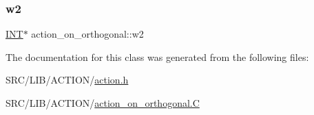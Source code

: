 \mbox{\label{classaction__on__orthogonal_a065f8bfe2652eb399fa66b9ead8000ce}} 
\subsubsection{\texorpdfstring{w2}{w2}}
{\footnotesize\ttfamily \mbox{\hyperlink{galois_8h_a09fddde158a3a20bd2dcadb609de11dc}{I\+NT}}$\ast$ action\+\_\+on\+\_\+orthogonal\+::w2}



The documentation for this class was generated from the following files\+:\begin{DoxyCompactItemize}
\item 
S\+R\+C/\+L\+I\+B/\+A\+C\+T\+I\+O\+N/\mbox{\hyperlink{action_8h}{action.\+h}}\item 
S\+R\+C/\+L\+I\+B/\+A\+C\+T\+I\+O\+N/\mbox{\hyperlink{action__on__orthogonal_8_c}{action\+\_\+on\+\_\+orthogonal.\+C}}\end{DoxyCompactItemize}
